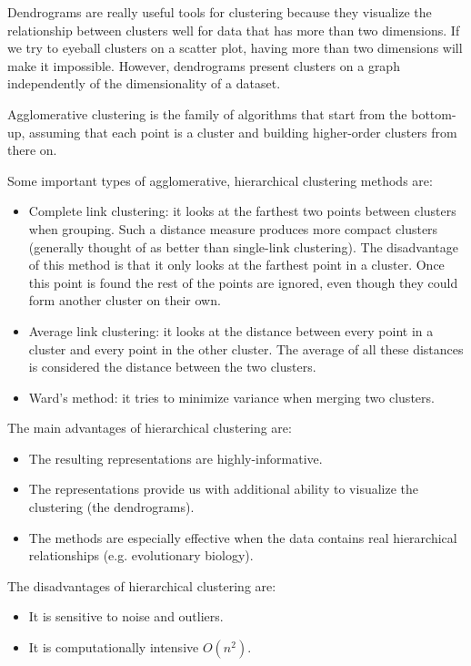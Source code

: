 \documentclass{article}
\begin{document}
Dendrograms are really useful tools for clustering because they visualize the relationship between clusters well for data that has more than two dimensions. If we try to eyeball clusters on a scatter plot, having more than two dimensions will make it impossible. However, dendrograms present clusters on a graph independently of the dimensionality of a dataset.

Agglomerative clustering is the family of algorithms that start from the bottom-up, assuming that each point is a cluster and building higher-order clusters from there on.

Some important types of agglomerative, hierarchical clustering methods are:

\begin{itemize}
  \item Complete link clustering: it looks at the farthest two points between clusters when grouping. Such a distance measure produces more compact clusters (generally thought of as better than single-link clustering). The disadvantage of this method is that it only looks at the farthest point in a cluster. Once this point is found the rest of the points are ignored, even though they could form another cluster on their own.
  \item Average link clustering: it looks at the distance between every point in a cluster and every point in the other cluster. The average of all these distances is considered the distance between the two clusters.
  \item Ward’s method: it tries to minimize variance when merging two clusters.
\end{itemize}

The main advantages of hierarchical clustering are:

\begin{itemize}
  \item The resulting representations are highly-informative.
  \item The representations provide us with additional ability to visualize the clustering (the dendrograms).
  \item The methods are especially effective when the data contains real hierarchical relationships (e.g. evolutionary biology).
\end{itemize}

The disadvantages of hierarchical clustering are:

\begin{itemize}
  \item It is sensitive to noise and outliers.
  \item It is computationally intensive $O(n^2)$.
\end{itemize}
\end{document}
